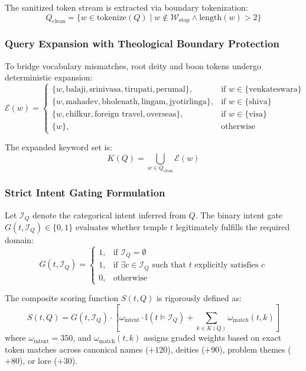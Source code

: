 \documentclass[lettersize,journal]{IEEEtran}
\begin{document}
The sanitized token stream is extracted via boundary tokenization:
\begin{equation}
Q_{\text{clean}} = \{ w \in \text{tokenize}(Q) \mid w \notin \mathcal{W}_{\text{stop}} \land \text{length}(w) > 2 \}
\end{equation}

\subsubsection{Query Expansion with Theological Boundary Protection}
To bridge vocabulary mismatches, root deity and boon tokens undergo deterministic expansion:
\begin{equation}
\mathcal{E}(w) = \begin{cases}
\{w, \text{balaji}, \text{srinivasa}, \text{tirupati}, \text{perumal}\}, & \text{if } w \in \{\text{venkateswara}\} \\
\{w, \text{mahadev}, \text{bholenath}, \text{lingam}, \text{jyotirlinga}\}, & \text{if } w \in \{\text{shiva}\} \\
\{w, \text{chilkur}, \text{foreign travel}, \text{overseas}\}, & \text{if } w \in \{\text{visa}\} \\
\{w\}, & \text{otherwise}
\end{cases}
\end{equation}

The expanded keyword set is:
\begin{equation}
K(Q) = \bigcup_{w \in Q_{\text{clean}}} \mathcal{E}(w)
\end{equation}

\subsubsection{Strict Intent Gating Formulation}
Let $\mathcal{I}_Q$ denote the categorical intent inferred from $Q$. The binary intent gate $G(t, \mathcal{I}_Q) \in \{0, 1\}$ evaluates whether temple $t$ legitimately fulfills the required domain:
\begin{equation}
G(t, \mathcal{I}_Q) = \begin{cases} 
1, & \text{if } \mathcal{I}_Q = \emptyset \\
1, & \text{if } \exists c \in \mathcal{I}_Q \text{ such that } t \text{ explicitly satisfies } c \\
0, & \text{otherwise}
\end{cases}
\end{equation}

The composite scoring function $S(t, Q)$ is rigorously defined as:
\begin{equation}
S(t, Q) = G(t, \mathcal{I}_Q) \cdot \left[ \omega_{\text{intent}} \cdot \mathbb{I}(t \models \mathcal{I}_Q) + \sum_{k \in K(Q)} \omega_{\text{match}}(t, k) \right]
\end{equation}
where $\omega_{\text{intent}} = 350$, and $\omega_{\text{match}}(t, k)$ assigns graded weights based on exact token matches across canonical names ($+120$), deities ($+90$), problem themes ($+80$), or lore ($+30$).
\end{document}
